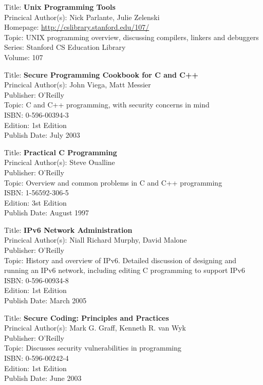 
Title: 	\textbf{Unix Programming Tools}	\\
Princical Author(s): 	Nick Parlante, Julie Zelenski \\
Homepage: 	\url{http://cslibrary.stanford.edu/107/}	\\	
Topic:		UNIX programming overview, discussing compilers, linkers and debuggers \\
Series:		Stanford CS Education Library	\\
Volume:		107 


Title: 	\textbf{Secure Programming Cookbook for C and C++}	\\
Princical Author(s): 	John Viega, Matt Messier  \\
Publisher:	O'Reilly	\\	
Topic:		C and C++ programming, with security concerns in mind \\
ISBN:			0-596-00394-3 \\
Edition:		1st Edition \\
Publish Date:		July 2003

	
Title: 	\textbf{Practical C Programming}	\\
Princical Author(s): 	Steve Oualline  \\
Publisher:	O'Reilly	\\	
Topic:		Overview and common problems in C and C++ programming \\
ISBN:			1-56592-306-5 \\
Edition:		3st Edition \\
Publish Date:		August 1997


Title: 	\textbf{IPv6 Network Administration}	\\
Princical Author(s): 	Niall Richard Murphy, David Malone  \\
Publisher:	O'Reilly	\\	
Topic:		History and overview of IPv6. Detailed discussion of
designing and running an IPv6 network, including editing C programming
to support IPv6 \\
ISBN:			0-596-00934-8 \\
Edition:		1st Edition \\
Publish Date:		March 2005


Title: 	\textbf{Secure Coding: Principles and Practices}	\\
Princical Author(s): 	Mark G. Graff, Kenneth R. van Wyk  \\
Publisher:	O'Reilly	\\	
Topic:		Discusses security vulnerabilities in programming \\
ISBN:			0-596-00242-4 \\
Edition:		1st Edition \\
Publish Date:		June 2003


